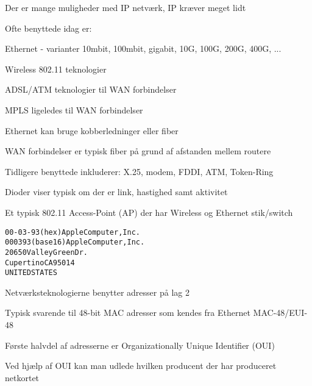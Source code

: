 \documentclass[Screen16to9,17pt]{foils}
\begin{document}



\begin{list1}
\item Der er mange muligheder med IP netværk, IP kræver meget lidt
\item Ofte benyttede idag er:
\begin{list2}
\item Ethernet - varianter 10mbit, 100mbit, gigabit, 10G, 100G, 200G, 400G, ...
\item Wireless 802.11 teknologier
\item ADSL/ATM teknologier til WAN forbindelser
\item MPLS ligeledes til WAN forbindelser
\end{list2}
\item Ethernet kan bruge kobberledninger eller fiber
\item WAN forbindelser er typisk fiber på grund af afstanden mellem routere
\item Tidligere benyttede inkluderer: X.25, modem, FDDI, ATM, Token-Ring
\end{list1}



\centerline{Dioder viser typisk om der er link, hastighed samt aktivitet}



\begin{list1}
\item Et typisk 802.11 Access-Point (AP) der har Wireless og Ethernet stik/switch
\end{list1}


\begin{alltt}
00-03-93   (hex)        Apple Computer, Inc.
000393     (base 16)    Apple Computer, Inc.
                        20650 Valley Green Dr.
                        Cupertino CA 95014
                        UNITED STATES
\end{alltt}
\begin{list1}
\item Netværksteknologierne benytter adresser på lag 2
\item Typisk svarende til 48-bit MAC adresser som kendes fra Ethernet MAC-48/EUI-48
\item Første halvdel af adresserne er Organizationally Unique Identifier (OUI)
\item Ved hjælp af OUI kan man udlede hvilken producent der har produceret netkortet
\item {}
\end{list1}
\end{document}
